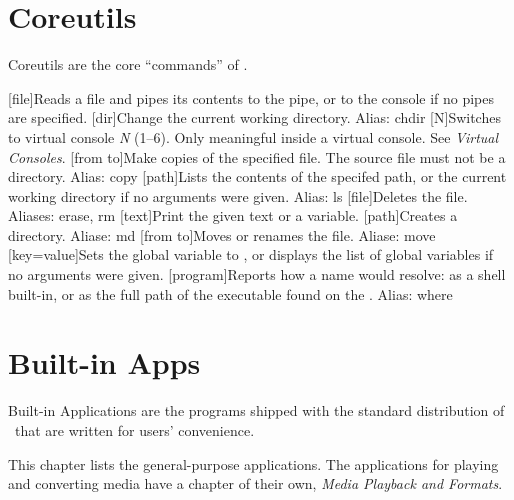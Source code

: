 \chapter{Coreutils}

Coreutils are the core ``commands'' of \thedos.

\begin{outline}
\1[file]{Reads a file and pipes its contents to the pipe, or to the console if no pipes are specified.}
\1[dir]{Change the current working directory. Alias: chdir}
\1[N]{Switches to virtual console \emph{N} (1--6). Only meaningful inside a virtual console. See \emph{Virtual Consoles}.}
\1
\1[from to]{Make copies of the specified file. The source file must not be a directory. Alias: copy}
\1
\1[path]{Lists the contents of the specifed path, or the current working directory if no arguments were given. Alias: ls}
\1[file]{Deletes the file. Aliases: erase, rm}
\1[text]{Print the given text or a variable.}
\1
\1[path]{Creates a directory. Aliase: md}
\1[from to]{Moves or renames the file. Aliase: move}
\1
\1
\1[key=value]{Sets the global variable  to , or displays the list of global variables if no arguments were given.}
\1
\1[program]{Reports how a name would resolve: as a shell built-in, or as the full path of the executable found on the . Alias: where}
\end{outline}



\chapter{Built-in Apps}

Built-in Applications are the programs shipped with the standard distribution of \thedos\ that are written for users' convenience.

This chapter lists the general-purpose applications. The applications for playing and converting media have a chapter of their own, \emph{Media Playback and Formats}.

